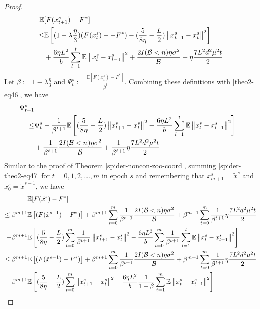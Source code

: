 \documentclass[iicol,sn-basic]{sn-jnl}
\theoremstyle{thmstyleone}%
\theoremstyle{thmstyletwo}%
\theoremstyle{thmstylethree}%
\newcommand*{\E}{\mathbb{E}}
\newcommand{\norm}[1]{\left\lVert#1\right\rVert}
\begin{document}
\begin{proof}
\begin{align}
\E&[F({x}_{t+1}^s) - F^*] \notag
\notag
\\ \leq & \E\left[(1-\lambda\frac{\eta}{3})(F({x}_{t}^s) - - F^*)  -(\frac{5}{8\eta} - \frac{L}{2})\norm{{x}_{t+1}^s-x_{t}^s}^2 \right]\notag
\\&+\frac{6\eta L^2}{b}\sum_{l=1}^t\E\norm{x_{l}^s-{x}_{l-1}^{s}}^2 + \frac{2I(\mathcal{B} < n)\eta \sigma ^2}{\mathcal{B}}+\eta \frac{7L^2 d^2 \mu^2 t}{2}
 \end{align}
 Let $\beta := 1 - \lambda\frac{\eta}{3}$ and $\Psi_t^s := \frac{\E[F({x}_{t}^s)-F^*]}{\beta^t}$. Combining these definitions with \eqref{theo2-eq46}, we have  
\begin{align} 
\Psi_{t+1}^s \notag
\notag
\\ \leq & \Psi_{t}^s - \frac{1}{\beta^{t+1}} \E\left[  (\frac{5}{8\eta} - \frac{L}{2})\norm{{x}_{t+1}^s-x_{t}^s}^2 - \frac{6\eta L^2}{b}\sum_{l=1}^t\E\norm{x_{l}^s-{x}_{l-1}^{s}}^2\right]\notag
\\& + \frac{1}{\beta^{t+1}}\frac{2I(\mathcal{B} < n)\eta \sigma ^2}{\mathcal{B}}+ \frac{1}{\beta^{t+1}} \eta \frac{7L^2 d^2 \mu^2 t}{2}\label{spider-theo2-eq47}
 \end{align}
 Similar to the proof of Theorem \ref{spider-noncon-zoo-coord}, summing \eqref{spider-theo2-eq47} for $t=0,1, 2, \ldots, m$ in epoch $s$ and remembering that $x_{m+1}^s = \tilde{x}^s$ and $x_0^s = \tilde{x}^{s-1}$, we have 
\begin{align}
\E&[F(\tilde{x}^s)-F^*]\notag\\
\leq\beta^{m+1}\E&\left[(F(\tilde{x}^{s-1}) - F^*)\right] +\beta^{m+1}\sum_{t=0}^m \frac{1}{\beta^{t+1}}\frac{2I(\mathcal{B} < n)\eta \sigma ^2}{\mathcal{B}}+\beta^{m+1}\sum_{t=0}^m \frac{1}{\beta^{t+1}}\eta \frac{7 L^2 d^2 \mu^2 t}{2}\notag
\\-\beta^{m+1}\E&\left[(\frac{5}{8\eta} - \frac{L}{2})\sum_{t=0}^m\frac{1}{\beta^{t+1}} \norm{{x}_{t+1}^s-x_{t}^s}^2 - \frac{6\eta L^2}{b}\sum_{t=0}^m \frac{1}{\beta^{t+1}}\sum_{l=1}^t\E\norm{x_{l}^s-{x}_{l-1}^{s}}^2 \right]\notag\\
\leq\beta^{m+1}\E&\left[(F(\tilde{x}^{s-1}) - F^*)\right] +\beta^{m+1}\sum_{t=0}^m \frac{1}{\beta^{t+1}}\frac{2I(\mathcal{B} < n)\eta \sigma ^2}{\mathcal{B}}+\beta^{m+1}\sum_{t=0}^m \frac{1}{\beta^{t+1}}\eta \frac{7 L^2 d^2 \mu^2 t}{2}\notag
\\-\beta^{m+1}\E&\left[(\frac{5}{8\eta} - \frac{L}{2})\sum_{t=0}^m \norm{{x}_{t+1}^s-x_{t}^s}^2 - \frac{6\eta L^2}{b}\frac{1}{1 - \beta} \sum_{t=1}^m \E\norm{x_{t}^s-{x}_{t-1}^{s}}^2 \right]\notag\\

\end{align}
\end{proof}
\end{document}
